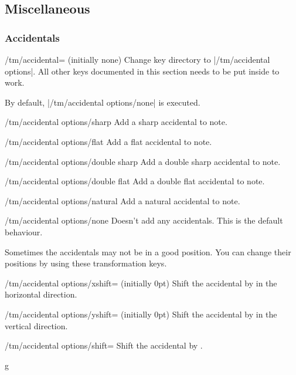 \subsection{Miscellaneous}\label{sec:music-notes:misc}
\subsubsection{Accidentals}\label{sec:music-notes:misc:accidentals}
\begin{key}{/tm/accidental= (initially none)}
  Change key directory to |/tm/accidental options|. All other keys documented in 
  this section needs to be put inside  to work.

  By default, |/tm/accidental options/none| is executed.
\end{key}
\begin{key}{/tm/accidental options/sharp}
  Add a sharp accidental to note.
\end{key}
\begin{key}{/tm/accidental options/flat}
  Add a flat accidental to note.
\end{key}
\begin{key}{/tm/accidental options/double sharp}
  Add a double sharp accidental to note.
\end{key}
\begin{key}{/tm/accidental options/double flat}
  Add a double flat accidental to note.
\end{key}
\begin{key}{/tm/accidental options/natural}
  Add a natural accidental to note.
\end{key}
\begin{key}{/tm/accidental options/none}
  Doesn't add any accidentals. This is the default behaviour.
\end{key}
Sometimes the accidentals may not be in a good position. You can change their positions 
by using these transformation keys.
\begin{key}{/tm/accidental options/xshift= (initially 0pt)}
  Shift the accidental by  in the horizontal direction.
\end{key}
\begin{key}{/tm/accidental options/yshift= (initially 0pt)}
  Shift the accidental by  in the vertical direction.
\end{key}
\begin{key}{/tm/accidental options/shift=}
  Shift the accidental by .
\end{key}
\begin{codeexample}[]
\begin{tmline}%
\begin{tmstaff}{g}{}
   
\end{tmstaff}%
\end{tmline}
\end{codeexample}
